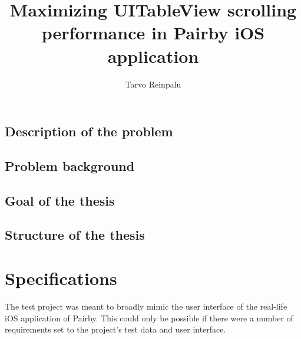 \documentclass[a4paper,12pt]{article}
\begin{document}
\begin{itkTitlePage}
\title{Maximizing UITableView scrolling performance in Pairby iOS application}
\author{Tarvo Reinpalu}
\end{itkTitlePage}




\itkMakeAuthorDeclaration

\clearpage
\thispagestyle{empty}
\tableofcontents
\newpage




\newpage
{}

\subsection*{Description of the problem}

\subsection*{Problem background}

\subsection*{Goal of the thesis}

\subsection*{Structure of the thesis}

\newpage
\section{Specifications}
The test project was meant to broadly mimic the user interface of the real-life iOS application of Pairby. This could only be possible if there were a number of requirements set to the project's test data and user interface.
\end{document}
